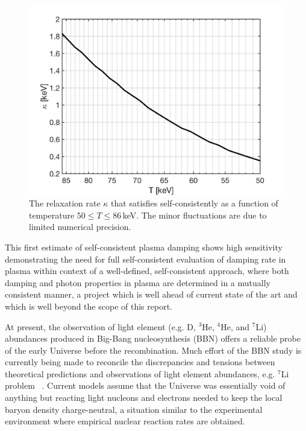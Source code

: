 \begin{figure} 
\centerline{
\includegraphics[width=0.9\linewidth]{./plots/OverdampingKappa.jpg}}
\caption{The relaxation rate $\kappa$ that satisfies  self-consistently as a function of temperature $50\leqslant T\leqslant 86$\,keV. The minor fluctuations are due to limited numerical precision. }
\label{KappaSol:fig} 
\end{figure}

This first estimate of self-consistent plasma damping shows high sensitivity demonstrating the need for full self-consistent evaluation of damping  rate in plasma within context  of a well-defined, self-consistent approach, where both damping and photon properties in plasma are determined in a mutually consistent manner, a project which is well ahead of current state of the art and which is well beyond the scope of this report.  

\label{sec:Discussion}
At present, the observation of light element (e.g. D, $^3$He, $^4$He, and $^7$Li) abundances produced in Big-Bang nucleosynthesis (BBN) offers a reliable probe of the early Universe before the recombination. Much effort of the BBN study is currently being made to reconcile the discrepancies and tensions between theoretical predictions and observations of light element abundances, e.g. $^7$Li problem ~\cite{Pitrou:2018cgg}.
Current models assume that the Universe was essentially void of anything but reacting light nucleons and electrons needed to keep the local baryon density charge-neutral, a situation similar to the experimental environment where empirical nuclear reaction rates are obtained.

